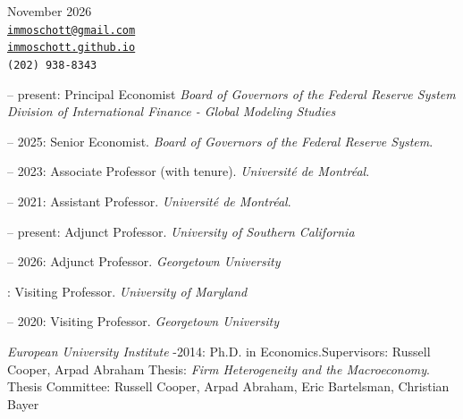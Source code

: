 \documentclass[11pt]{article}
\makeatletter
\def\myemail{immoschott@gmail.com}
\def\myweb{immoschott.github.io}
\def\myphone{(202) 938-8343}
\makeatother
\begin{document}
\hfill
\begin{minipage}[t]{1.7in}
  \flushright   \footnotesize  November 2026  \\
  {\scriptsize  \texttt{\href{mailto:\myemail}{\myemail}}} \\ \vspace{-0.02in}
  {\scriptsize  \texttt{\href{https://immoschott.github.io}{\myweb}}} \\
  {\scriptsize  \texttt{\myphone}}

\end{minipage}


\reversemarginpar

 -- present: Principal Economist  \vspace{0.01in}
\newline \indent \emph{Board of Governors of the Federal Reserve System}
\newline \indent \emph{Division of International Finance - Global Modeling Studies}


 -- 2025: Senior Economist. \emph{Board of Governors of the Federal Reserve System}.
 \smallskip


 -- 2023: Associate Professor (with tenure). \emph{Université de Montréal}.
 \smallskip

 -- 2021: Assistant Professor. \emph{Université de Montréal}.

 -- present: Adjunct Professor. \emph{University of Southern California}
\smallskip

 -- 2026: Adjunct Professor. \emph{Georgetown University}
\smallskip

: Visiting Professor. \emph{University of Maryland}
\smallskip

 -- 2020: Visiting Professor. \emph{Georgetown University}

\noindent\emph{European University Institute \vspace{0.01in}}
-2014: Ph.D. in Economics.\newline Supervisors: Russell Cooper, Arpad Abraham
\newline \ind Thesis: \emph{Firm Heterogeneity and the Macroeconomy}.
\newline \ind Thesis Committee: Russell Cooper, Arpad Abraham, Eric Bartelsman, Christian Bayer
\end{document}
